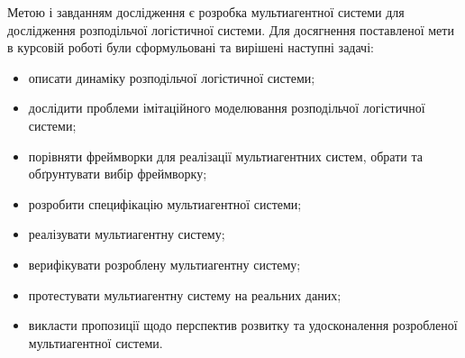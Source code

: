 Метою і завданням дослідження є розробка мультиагентної системи для дослідження розподільчої логістичної системи.
Для досягнення поставленої мети в курсовій роботі були сформульовані та вирішені наступні задачі:
\begin{itemize}
	\item описати динаміку розподільчої логістичної системи;
	\item дослідити проблеми імітаційного моделювання розподільчої логістичної системи;
	\item порівняти фреймворки для реалізації мультиагентних систем, обрати та обґрунтувати вибір фреймворку;
	\item розробити специфікацію мультиагентної системи;
	\item реалізувати мультиагентну систему;
	\item верифікувати розроблену мультиагентну систему;
	\item протестувати мультиагентну систему на реальних даних;
	\item викласти пропозиції щодо перспектив розвитку та удосконалення розробленої мультиагентної системи.
\end{itemize}
